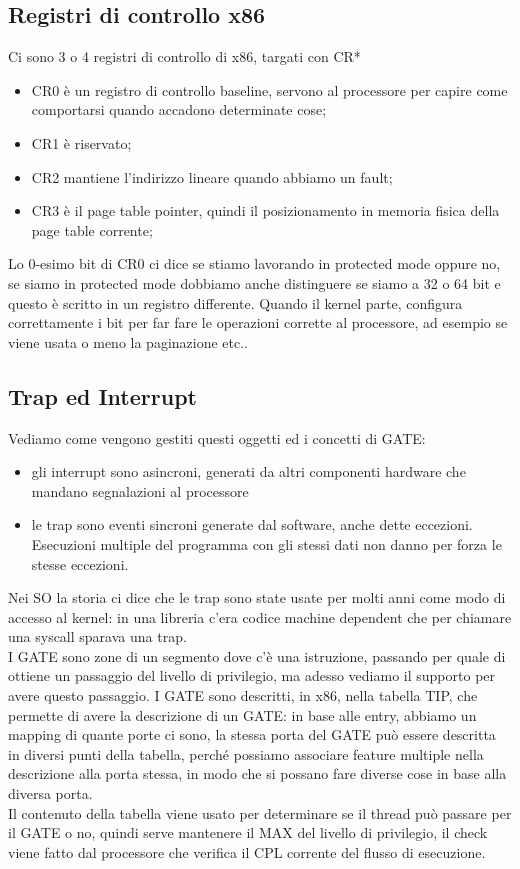 \documentclass[12pt, oneside]{extbook}
\begin{document}
\subsection{Registri di controllo x86}
Ci sono 3 o 4 registri di controllo di x86, targati con CR*
\begin{itemize}
\item CR0 è un registro di controllo baseline, servono al processore per capire come comportarsi quando accadono determinate cose;
\item CR1 è riservato;
\item CR2 mantiene l'indirizzo lineare quando abbiamo un fault;
\item CR3 è il page table pointer, quindi il posizionamento in memoria fisica della page table corrente;
\end{itemize}
Lo 0-esimo bit di CR0 ci dice se stiamo lavorando in protected mode oppure no, se siamo in protected mode dobbiamo anche distinguere se siamo a 32 o 64 bit e questo è scritto in un registro differente. Quando il kernel parte, configura correttamente i bit per far fare le operazioni corrette al processore, ad esempio se viene usata o meno la paginazione etc..
\subsection{Trap ed Interrupt}
Vediamo come vengono gestiti questi oggetti ed i concetti di GATE:
\begin{itemize}
\item gli interrupt sono asincroni, generati da altri componenti hardware che mandano segnalazioni al processore
\item le trap sono eventi sincroni generate dal software, anche dette eccezioni. Esecuzioni multiple del programma con gli stessi dati non danno per forza le stesse eccezioni.
\end{itemize}
Nei SO la storia ci dice che le trap sono state usate per molti anni come modo di accesso al kernel: in una libreria c'era codice machine dependent che per chiamare una syscall sparava una trap.\\ I GATE sono zone di un segmento dove c'è una istruzione, passando per quale di ottiene un passaggio del livello di privilegio, ma adesso vediamo il supporto per avere questo passaggio. I GATE sono descritti, in x86, nella tabella TIP, che permette di avere la descrizione di un GATE: in base alle entry, abbiamo un mapping di quante porte ci sono, la stessa porta del GATE può essere descritta in diversi punti della tabella, perché possiamo associare feature multiple nella descrizione alla porta stessa, in modo che si possano fare diverse cose in base alla diversa porta.\\ Il contenuto della tabella viene usato per determinare se il thread può passare per il GATE o no, quindi serve mantenere il MAX del livello di privilegio, il check viene fatto dal processore che verifica il CPL corrente del flusso di esecuzione.
\end{document}
